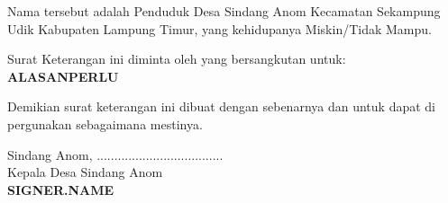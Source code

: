 \documentclass[a4paper, 12pt]{article}
\begin{document}
Nama tersebut adalah Penduduk Desa Sindang Anom Kecamatan Sekampung Udik Kabupaten Lampung Timur, yang kehidupanya Miskin/Tidak Mampu.
\vspace{0.5cm}

Surat Keterangan ini diminta oleh yang bersangkutan untuk: \\
\textbf{{{ALASANPERLU}}}
\vspace{0.5cm}

Demikian surat keterangan ini dibuat dengan sebenarnya dan untuk dapat di pergunakan sebagaimana mestinya.
\vspace{1.5cm}

\begin{flushright}
    Sindang Anom, .................................... \\
    Kepala Desa Sindang Anom \\
    \vspace{2.5cm} %
    \textbf{{{SIGNER.NAME}}} \\
\end{flushright}
\end{document}
